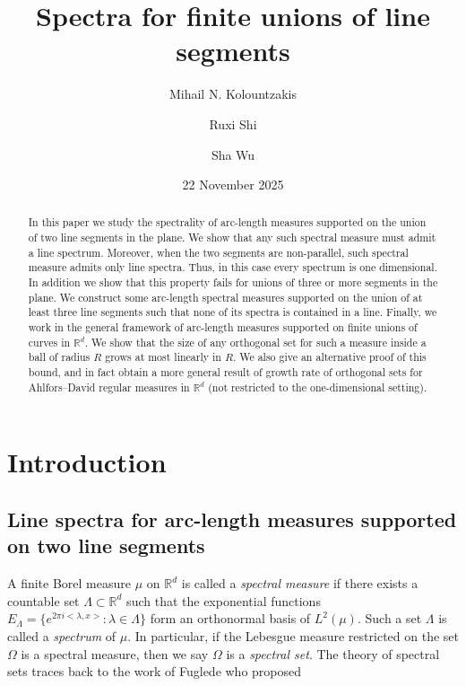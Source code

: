 \documentclass[12pt,a4paper,intlimits,sumlimits]{amsart}
\title{Spectra for finite unions of line segments}
\author{Mihail N. Kolountzakis}
\author{Ruxi Shi}
\author{Sha Wu}
\theoremstyle{plain}
\theoremstyle{definition}
\newcommand{\RR}{{\mathbb R}}
\begin{document}
\makeatletter
{}
\makeatother
{}
\date{22 November 2025}

\begin{abstract}
In this paper we study the spectrality of arc-length measures supported on the union of two line segments in the plane. We show that any such spectral measure must admit a line spectrum. Moreover, when the two segments are non-parallel, such   spectral measure admits only line spectra. Thus, in this case every spectrum is one dimensional.  In addition we show that this property fails for unions of three or more segments in the plane. We construct some arc-length spectral measures supported on the union of at least three line segments such that none of its spectra is contained in a line. Finally, we work in the general framework of arc-length  measures supported on 
finite unions of curves in $\mathbb{R}^d$. We show that the size of any orthogonal set for such a measure inside a ball of radius $R$ grows at most linearly in $R$.   We also give an alternative proof of this bound, and in fact obtain a more general result of growth  rate of orthogonal sets for Ahlfors--David regular measures in $\mathbb{R}^d$ (not restricted to the one-dimensional setting).
\end{abstract}
 \maketitle
\tableofcontents
 


\section{Introduction}

\subsection{Line  spectra for arc-length measures supported on two line segments}
A finite Borel measure 
$\mu$ on $\RR^{d}$
 is called a {\it spectral measure} if there exists a countable set $\Lambda\subset\RR^d$
 such that the exponential functions
$E_\Lambda=\{e^{2\pi i<\lambda, x>}: \lambda\in\Lambda\}$
form an orthonormal basis of $L^{2}(\mu)$.
Such a set  $ \Lambda$ is called a {\it spectrum} of $\mu$. In particular, if the  Lebesgue measure restricted on the set $\Omega$ is  a spectral measure,  then we say $\Omega$ is a {\it spectral set}.  The theory of spectral sets traces back to the work of Fuglede \cite{fuglede1974operators} who proposed 
\end{document}

